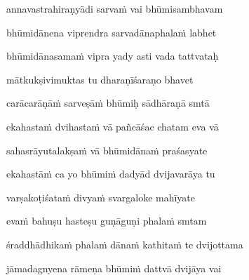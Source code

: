 annavastrahiraṇyādi sarva\.m vai bhūmisambhavam \veg\dontdisplaylinenum

bhūmidānena viprendra sarvadānaphala\.m labhet\thinspace{\dandab} \dontdisplaylinenum

bhūmidānasama\.m vipra yady asti vada tattvataḥ \veg\dontdisplaylinenum

mātkukṣivimuktas tu dharaṇīśaraṇo bhavet\thinspace{\dandab} \dontdisplaylinenum

carācarāṇā\.m sarveṣā\.m bhūmiḥ sādhāraṇā smtā \veg\dontdisplaylinenum

ekahasta\.m dvihasta\.m vā pañcāśac chatam eva vā\thinspace{\dandab} \dontdisplaylinenum

sahasrāyutalakṣa\.m vā bhūmidāna\.m praśasyate \veg\dontdisplaylinenum

ekahastā\.m ca yo bhūmi\.m dadyād dvijavarāya tu\thinspace{\dandab} \dontdisplaylinenum

varṣakoṭiśata\.m divya\.m svargaloke mahīyate \veg\dontdisplaylinenum

eva\.m bahuṣu hasteṣu guṇāguṇi phala\.m smtam\thinspace{\dandab} \dontdisplaylinenum

śraddhādhika\.m phala\.m dāna\.m kathita\.m te dvijottama \veg\dontdisplaylinenum

jāmadagnyena rāmeṇa bhūmi\.m dattvā dvijāya vai\thinspace{\dandab} \dontdisplaylinenum

